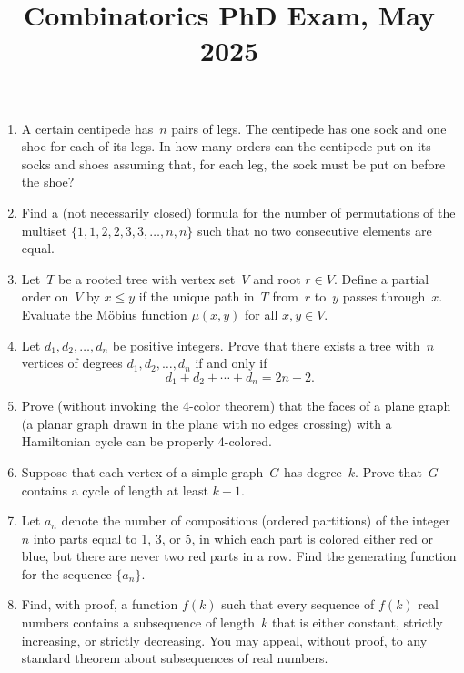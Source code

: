 \documentclass[11pt,letterpaper]{article}
\title{Combinatorics PhD Exam, May 2025}
\author{}
\date{}
\newenvironment{examproblems}[2]{%
  \def\ProblemHeadingTag{#2}%
  \AssignTaggingSocketPlug{block/list/label}{examproblem}%
  \begin{enumerate}%
  \setcounter{enumi}{#1}%
  \renewcommand{\labelenumi}{\textbf{\theenumi.}}%
  \setlength{\topsep}{0.35em}%
  \setlength{\partopsep}{0pt}%
  \setlength{\itemsep}{0.48em}%
  \setlength{\parsep}{0.18em}%
}{\end{enumerate}}
\begin{document}
\maketitle
\thispagestyle{empty}
\begin{examproblems}{0}{H2}
\def\ProblemHeadingText{Problem 1.}
\item
A certain centipede has~\(n\) pairs of legs. The centipede has one sock and one shoe for each of its legs. In how many orders can the centipede put on its socks and shoes assuming that, for each leg, the sock must be put on before the shoe?
\def\ProblemHeadingText{Problem 2.}
\item
Find a (not necessarily closed) formula for the number of permutations of the multiset \(\{1,1,2,2,3,3,\ldots,n,n\}\) such that no two consecutive elements are equal.
\def\ProblemHeadingText{Problem 3.}
\item
Let~\(T\) be a rooted tree with vertex set~\(V\) and root \(r\in V\). Define a partial order on~\(V\) by \(x\leq y\) if the unique path in~\(T\) from~\(r\) to~\(y\) passes through~\(x\). Evaluate the Möbius function \(\mu(x,y)\) for all \(x,y\in V\).
\def\ProblemHeadingText{Problem 4.}
\item
Let \(d_1,d_2,\ldots,d_n\) be positive integers. Prove that there exists a tree with~\(n\) vertices of degrees \(d_1,d_2,\ldots,d_n\) if and only if
\[
d_1+d_2+\cdots+d_n=2n-2.
\]
\def\ProblemHeadingText{Problem 5.}
\item
Prove (without invoking the 4-color theorem) that the faces of a plane graph (a planar graph drawn in the plane with no edges crossing) with a Hamiltonian cycle can be properly 4-colored.
\def\ProblemHeadingText{Problem 6.}
\item
Suppose that each vertex of a simple graph~\(G\) has degree~\(k\). Prove that~\(G\) contains a cycle of length at least \(k+1\).
\def\ProblemHeadingText{Problem 7.}
\item
Let \(a_n\) denote the number of compositions (ordered partitions) of the integer~\(n\) into parts equal to 1, 3, or 5, in which each part is colored either red or blue, but there are never two red parts in a row. Find the generating function for the sequence \(\{a_n\}\).
\def\ProblemHeadingText{Problem 8.}
\item
Find, with proof, a function \(f(k)\) such that every sequence of \(f(k)\) real numbers contains a subsequence of length~\(k\) that is either constant, strictly increasing, or strictly decreasing. You may appeal, without proof, to any standard theorem about subsequences of real numbers.
\end{examproblems}
\end{document}
